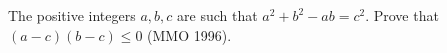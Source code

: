 The positive integers $a, b, c$ are such that $a^2 + b^2 - ab = c^2$. Prove that $(a - c)(b - c) \leq 0$ (MMO 1996).
